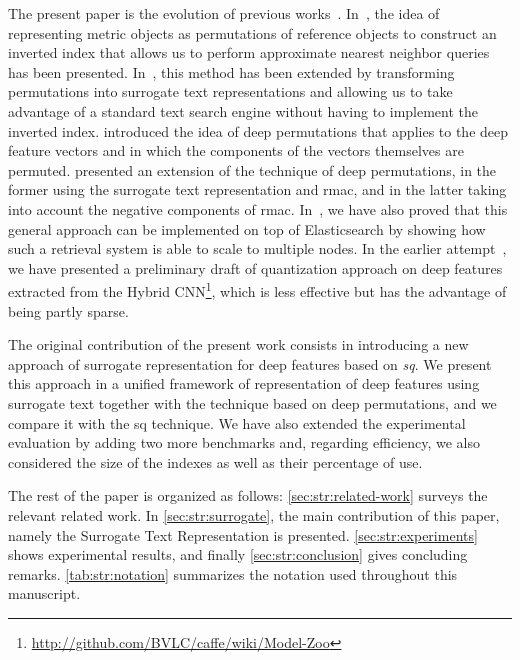 The present paper is the evolution of previous works~\cite{amato2014mi,gennaro2010approach,amato2016deep,amato2017efficient,amato2018large}.
In~\cite{amato2014mi}, the idea of representing metric objects as permutations of reference objects to construct an inverted index that allows us to perform approximate nearest neighbor queries has been presented.
In~\cite{gennaro2010approach}, this method has been extended by transforming permutations into surrogate text representations and allowing us to take advantage of a standard text search engine without having to implement the inverted index.
\citet{amato2016deep} introduced the idea of deep permutations that applies to the deep feature vectors and in which the components of the vectors themselves are permuted.
\citet{amato2017efficient,amato2018large} presented an extension of the technique of deep permutations, in the former using the surrogate text representation and \gls{rmac}, and in the latter taking into account the negative components of \gls{rmac}.
In~\cite{amato2018large}, we have also proved that this general approach can be implemented on top of Elasticsearch by showing how such a retrieval system is able to scale to multiple nodes.
In the earlier attempt~\cite{amato2016large}, we have presented a preliminary draft of quantization approach on deep features extracted from the Hybrid CNN\footnote{\url{http://github.com/BVLC/caffe/wiki/Model-Zoo}}, which is less effective but has the advantage of being partly sparse.

The original contribution of the present work consists in introducing a new approach of surrogate representation for deep features based on \emph{\gls{sq}}.
We present this approach in a unified framework of representation of deep features using surrogate text together with the technique based on deep permutations, and we compare it with the \gls{sq} technique.
We have also extended the experimental evaluation by adding two more benchmarks and, regarding efficiency, we also considered the size of the indexes as well as their percentage of use.

The rest of the paper is organized as follows: \ref{sec:str:related-work} surveys the relevant related work.
In \ref{sec:str:surrogate}, the main contribution of this paper, namely the Surrogate Text Representation is presented.
\ref{sec:str:experiments} shows experimental results, and finally \ref{sec:str:conclusion} gives concluding remarks.
\ref{tab:str:notation} summarizes the  notation used throughout this manuscript.

